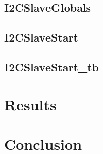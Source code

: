 \subsection{I2CSlaveGlobals}
\subsection{I2CSlaveStart}
\subsection{I2CSlaveStart_tb}

\section{Results}

\section{Conclusion}







